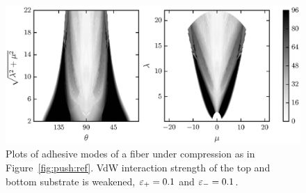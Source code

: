 	\begin{figure}[t]
		\begin{center}
			\includegraphics{./fig/ch3/push/eb0.1_et0.1/grid.eps}
		\end{center}		
		\caption{Plots of adhesive modes of a fiber under compression as in Figure~\ref{fig:push:ref}. VdW interaction strength of the top and bottom substrate is weakened, $\varepsilon_+=0.1$ and $\varepsilon_-=0.1$.
		\label{fig:push:eb0.1_et0.1}}
	\end{figure}	

